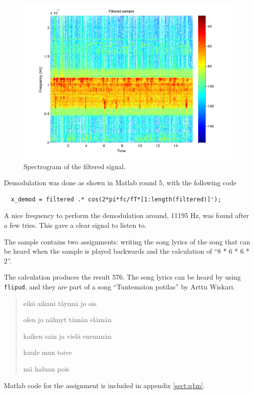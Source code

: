 \begin{figure}
  \begin{center}
    \hspace*{-1in}
    \includegraphics[width=180mm]{q1_filtered_spectrogram}
    \caption{Spectrogram of the filtered signal. 
      \label{fig:q1_filtered_spectrogram}}
  \end{center}  
\end{figure}

Demodulation was done as shown in Matlab round 5, with the following code
\begin{verbatim}
  x_demod = filtered .* cos(2*pi*fc/fT*[1:length(filtered)]');
\end{verbatim}

A nice frequency to perform the demodulation around, 11195 Hz, was found
after a few tries.  This gave a clear signal to listen to.

The sample contains two assignments: writing the song lyrics of the song
that can be heard when the sample is played backwards and the
calculation of ``8 * 6 * 6 * 2''.

The calculation produces the result 576.  The song lyrics can be heard
by using {\tt flipud}, and they are part of a song ``Tuntematon
potilas'' by Arttu Wiskari\cite{wiskari2010}.

\begin{quotation}
eikö aikani täynnä jo ois

olen jo nähnyt tämän elämän

kaiken sain ja vielä enemmän

kuule mun toive

mä haluan pois
\end{quotation}

Matlab code for the assignment is included in appendix \ref{sect:q1m}.

